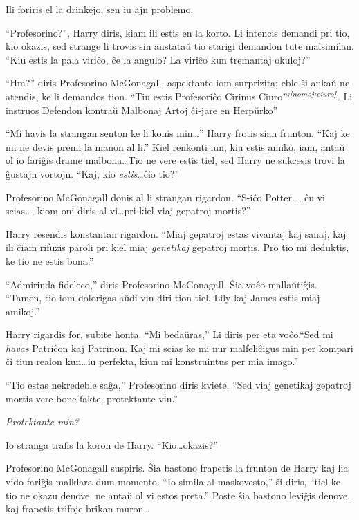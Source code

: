Ili foriris el la drinkejo, sen iu ajn problemo.

``Profesorino?'', Harry diris, kiam ili estis en la korto. Li intencis
demandi pri tio, kio okazis, sed strange li trovis sin anstataŭ tio
starigi demandon tute malsimilan.  ``Kiu estis la pala viriĉo, ĉe la
angulo? La viriĉo kun tremantaj okuloj?''

``Hm?'' diris Profesorino McGonagall, aspektante iom surprizita; eble
ŝi ankaŭ ne atendis, ke li demandos tion. ``Tiu estis Profesoriĉo
Cirinus Ciuro$^{\textit{n:\ref{nomoj:ciuro}}}$. Li instruos Defendon kontraŭ
Malbonaj Artoj ĉi-jare en Herpŭrko''

``Mi havis la strangan senton ke li konis min\ldots'' Harry frotis
sian frunton. ``Kaj ke mi ne devis premi la manon al li.'' Kiel
renkonti iun, kiu estis amiko, iam, antaŭ ol io fariĝis drame
malbona\ldots Tio ne vere estis tiel, sed Harry ne sukcesis trovi la
ĝustajn vortojn. ``Kaj, kio \emph{estis}\ldots ĉio tio?''

Profesorino McGonagall donis al li strangan rigardon. ``S-iĉo
Potter\ldots, ĉu vi scias\ldots, kiom oni diris al vi\ldots pri kiel
viaj gepatroj mortis?''

Harry resendis konstantan rigardon. ``Miaj gepatroj estas vivantaj kaj
sanaj, kaj ili ĉiam rifuzis paroli pri kiel miaj \emph{genetikaj}
gepatroj mortis. Pro tio mi deduktis, ke tio ne estis bona.''

``Admirinda fideleco,'' diris Profesorino McGonagall. Ŝia voĉo
mallaŭtiĝis. ``Tamen, tio iom dolorigas aŭdi vin diri tion tiel. Lily
kaj James estis miaj amikoj.''

Harry rigardis for, subite honta. ``Mi bedaŭras,'' Li diris per
eta voĉo.``Sed mi \emph{havas} Patriĉon kaj Patrinon. Kaj mi scias ke mi
nur malfeliĉigus min per kompari ĉi tiun realon kun\ldots iu
perfekta, kiun mi konstruintus per mia imago.''

``Tio estas nekredeble saĝa,'' Profesorino diris kviete. ``Sed viaj
genetikaj gepatroj mortis vere bone fakte, protektante vin.''

\emph{Protektante min?}

Io stranga trafis la koron de Harry. ``Kio\ldots okazis?''

Profesorino McGonagall suspiris. Ŝia bastono frapetis la frunton de
Harry kaj lia vido fariĝis malklara dum momento. ``Io simila al
maskovesto,'' ŝi diris, ``tiel ke tio ne okazu denove, ne antaŭ ol vi
estos preta.''  Poste ŝia bastono leviĝis denove, kaj frapetis trifoje
brikan muron\ldots

